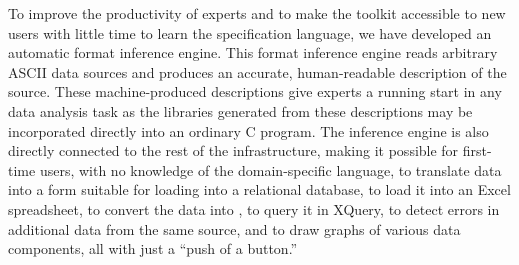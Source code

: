 To improve the productivity of experts and to 
make the \pads{} toolkit accessible to new users with 
little time to learn the specification language,
we have developed an automatic format inference engine.
This format inference engine reads arbitrary ASCII data sources
and produces an accurate, human-readable description of the source.
These machine-produced descriptions give experts a running start
in any data analysis task as the libraries generated from these
descriptions may be incorporated directly into an ordinary C program.
The inference engine is also directly connected to the rest of the
\pads{} infrastructure, making it possible for first-time users,
with no knowledge of the \pads{} domain-specific language, 
to translate data into a form suitable for loading into a relational database, 
to load it into an Excel spreadsheet,
to convert the data into \xml{},
to query it in XQuery,
to detect errors in additional data from the same source,
and to draw graphs of various data components, all
with just a ``push of a button.''

